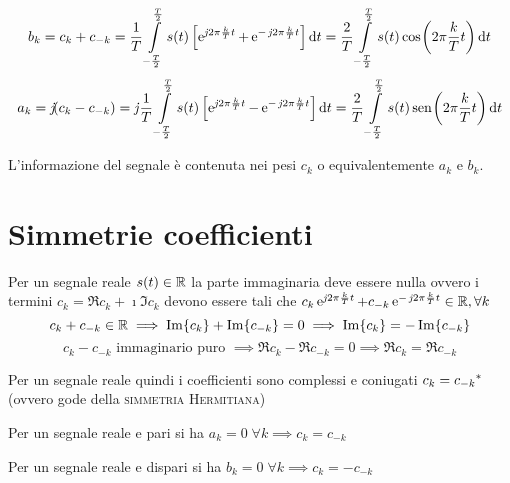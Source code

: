 \[b_k=c_k+c_{-k}=\frac{1}{T}\int\limits_{-\frac{T}{2}}^{\frac{T}{2}}{s(t)\left[\operatorname{e}^{\operatorname{\mathit{j}\!} 2\pi\frac{k}{T}t}+\operatorname{e}^{-\operatorname{\mathit{j}\!} 2\pi\frac{k}{T}t}\right]}{\,\mathop{}\!\mathrm{d}{t}}=\frac{2}{T}\int\limits_{-\frac{T}{2}}^{\frac{T}{2}}{s(t)\,{\operatorname{cos}}^{}\!\left({2\pi\frac{k}{T}t}\right)}{\,\mathop{}\!\mathrm{d}{t}} \]
\[a_k=\operatorname{\mathit{j}\!}(c_k-c_{-k})=\operatorname{\mathit{j}\!}\frac{1}{T}\int\limits_{-\frac{T}{2}}^{\frac{T}{2}}{s(t)\left[\operatorname{e}^{\operatorname{\mathit{j}\!} 2\pi\frac{k}{T}t}-\operatorname{e}^{-\operatorname{\mathit{j}\!} 2\pi\frac{k}{T}t}\right]}{\,\mathop{}\!\mathrm{d}{t}}=\frac{2}{T}\int\limits_{-\frac{T}{2}}^{\frac{T}{2}}{s(t)\,{\operatorname{sen}}^{}\!\left({2\pi\frac{k}{T}t}\right)}{\,\mathop{}\!\mathrm{d}{t}} \]

\begin{nota}L'informazione del segnale è contenuta nei pesi $c_k$ o equivalentemente $a_k$ e $b_k$.
\end{nota}

\section{Simmetrie coefficienti}
Per un segnale reale $s(t)\in\mathbb{R}$ la parte immaginaria deve essere nulla ovvero i termini $c_k=\Re{c_k} + \imath \Im{c_k}$ devono essere tali che $c_k \operatorname{e}^{\operatorname{\mathit{j}\!} 2\pi\frac{k}{T}t}+ c_{-k}\operatorname{e}^{-\operatorname{\mathit{j}\!} 2\pi\frac{k}{T}t}\in\mathbb{R},\forall k$
\[c_k+c_{-k}\in\mathbb{R} \implies \operatorname{Im}\!\left\lbrace{c_k}\right\rbrace+\operatorname{Im}\!\left\lbrace{c_{-k}}\right\rbrace=0 \implies \operatorname{Im}\!\left\lbrace{c_k}\right\rbrace=-\operatorname{Im}\!\left\lbrace{c_{-k}}\right\rbrace\]
\[c_k-c_{-k} \text{ immaginario puro } \implies \Re{c_k} -\Re{c_{-k}}=0 \implies \Re{c_k}=\Re{c_{-k}} \]

Per un segnale reale quindi i coefficienti sono complessi e coniugati $c_k={c_{-k}}^\ast$ (ovvero gode della \textsc{simmetria Hermitiana})

Per un segnale reale e pari si ha $a_k=0\;\forall k \implies c_k=c_{-k}$

Per un segnale reale e dispari si ha $b_k=0\;\forall k \implies c_k=-c_{-k}$


